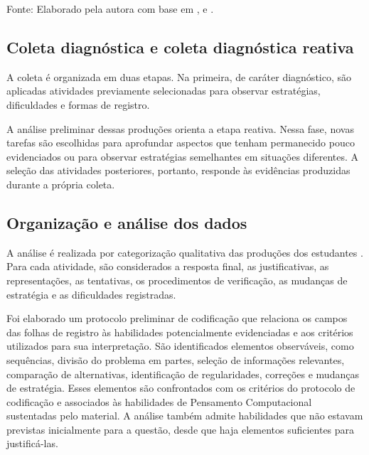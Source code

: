 \begin{quadro}[htbp]
\begin{tabularx}{\textwidth}{
        |>{\raggedright\arraybackslash}p{3.0cm}
        |>{\raggedright\arraybackslash}p{4.6cm}
        |>{\raggedright\arraybackslash}X|}
    \end{tabularx}
    \addtocounter{table}{-1}

    \vspace{2mm}

    \begin{flushleft}
        \footnotesize
        Fonte: Elaborado pela autora com base em
        ,
         e
        .
    \end{flushleft}

\end{quadro}


\subsection{Coleta diagnóstica e coleta diagnóstica reativa}

A coleta é organizada em duas etapas. Na primeira, de caráter diagnóstico, são aplicadas atividades previamente selecionadas para observar estratégias, dificuldades e formas de registro.

A análise preliminar dessas produções orienta a etapa reativa. Nessa fase, novas tarefas são escolhidas para aprofundar aspectos que tenham permanecido pouco evidenciados ou para observar estratégias semelhantes em situações diferentes. A seleção das atividades posteriores, portanto, responde às evidências produzidas durante a própria coleta.

\subsection{Organização e análise dos dados}
\label{sec:organizacao-analise}

A análise é realizada por categorização qualitativa das produções dos estudantes \cite{sampaio2021}. Para cada atividade, são considerados a resposta final, as justificativas, as representações, as tentativas, os procedimentos de verificação, as mudanças de estratégia e as dificuldades registradas.

Foi elaborado um protocolo preliminar de codificação que relaciona os campos das folhas de registro às habilidades potencialmente evidenciadas e aos critérios utilizados para sua interpretação. São identificados elementos observáveis, como sequências, divisão do problema em partes, seleção de informações relevantes, comparação de alternativas, identificação de regularidades, correções e mudanças de estratégia. Esses elementos são confrontados com os critérios do protocolo de codificação e associados às habilidades de Pensamento Computacional sustentadas pelo material. A análise também admite habilidades que não estavam previstas inicialmente para a questão, desde que haja elementos suficientes para justificá-las.
 
